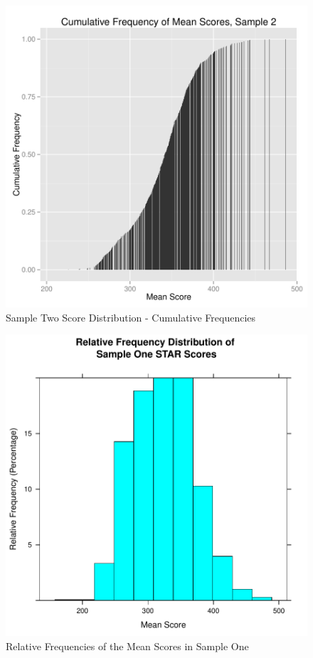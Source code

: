 \documentclass[twocolumn,english]{IEEEtran}
\theoremstyle{plain}
\theoremstyle{plain}
\begin{document}
\begin{figure}[H]
\begin{centering}
\includegraphics{proj3-fig_scores2}
\caption{Sample Two Score Distribution - Cumulative Frequencies}
\label{fig:Scores_Hist_Two}
\end{centering}
\end{figure}


\begin{figure}[H]
\begin{centering}
\includegraphics{proj3-rel_freq_scores1}
\caption{Relative Frequencies of the Mean Scores in Sample One}
\label{fig:pie_education}
\end{centering}
\end{figure}
\end{document}
